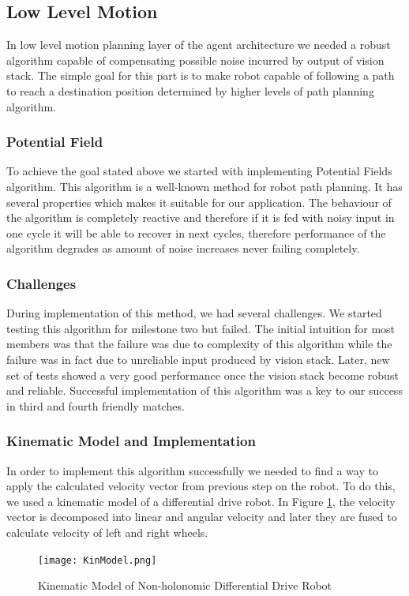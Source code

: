 \subsection{Low Level Motion}
In low level motion planning layer of the agent architecture we needed a robust algorithm capable of compensating possible noise incurred by output of vision stack.  The simple goal for this part is to make robot capable of following a path to reach a destination position determined by higher levels of path planning algorithm.\linebreak

\subsubsection{Potential Field}
To achieve the goal stated above we started with implementing Potential Fields\cite{paper:PF} algorithm. This algorithm is a well-known method for robot path planning. It has several properties which makes it suitable for our application. The behaviour of the algorithm is completely reactive and therefore if it is fed with noisy input in one cycle it will be able to recover in next cycles, therefore performance of the algorithm degrades as amount of noise increases never failing completely.\linebreak

\subsubsection{Challenges}
During implementation of this method, we had several challenges. We started testing this algorithm for milestone two but failed. The initial intuition for most members was that the failure was due to complexity of this algorithm while the failure was in fact due to unreliable input produced by vision stack. Later, new set of tests showed a very good performance once the vision stack become robust and reliable. Successful implementation of this algorithm was a key to our success in third and fourth friendly matches.\linebreak

\subsubsection{Kinematic Model and Implementation}
In order to implement this algorithm successfully we needed to find a way to apply the calculated velocity vector from previous step on the robot. To do this, we used a kinematic model of a differential drive robot. In Figure \ref{fig:KinModel}, the velocity vector is decomposed into linear and angular velocity and later they are fused to calculate velocity of left and right wheels.
\begin{figure}[htp]
\begin{center}
\leavevmode
\texttt{[image: KinModel.png]}
\end{center}
\caption{Kinematic Model of Non-holonomic Differential Drive Robot}
\label{fig:KinModel}
\end{figure}

